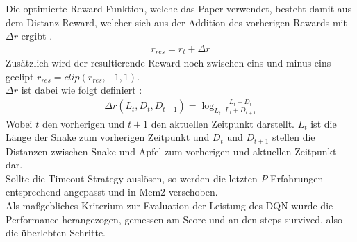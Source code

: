 Die optimierte Reward Funktion, welche das Paper verwendet, besteht damit aus dem Distanz Reward, welcher sich aus der Addition des vorherigen Rewards mit $\Delta r$ ergibt .
\begin{align}
	r_{res} = r_t + \Delta r
	\label{eq:Verwandte_Arbeiten_r}
\end{align}
Zusätzlich wird der resultierende Reward noch zwischen eins und minus eins geclipt $r_{res} = clip (r_{res}, -1, 1)$.\\
$\Delta r$ ist dabei wie folgt definiert :
\begin{align}
	\Delta r(L_t, D_t,D_{t+1}) = \log_{L_t}\frac{L_t + D_t}{L_t + D_{t + 1}}
	\label{eq:Verwandte_Arbeiten_Delta_r}
\end{align}
Wobei $t$ den vorherigen und $t+1$ den aktuellen Zeitpunkt darstellt. $L_t$ ist die Länge der Snake zum vorherigen Zeitpunkt und $D_t$ und $D_{t+1}$ stellen die Distanzen zwischen Snake und Apfel zum vorherigen und aktuellen Zeitpunkt dar.\\
Sollte die Timeout Strategy auslösen, so werden die letzten $P$ Erfahrungen entsprechend angepasst und in Mem2 verschoben.\\
Als maßgebliches Kriterium zur Evaluation der Leistung des DQN wurde die Performance herangezogen, gemessen am Score und an den steps survived, also die überlebten Schritte.

